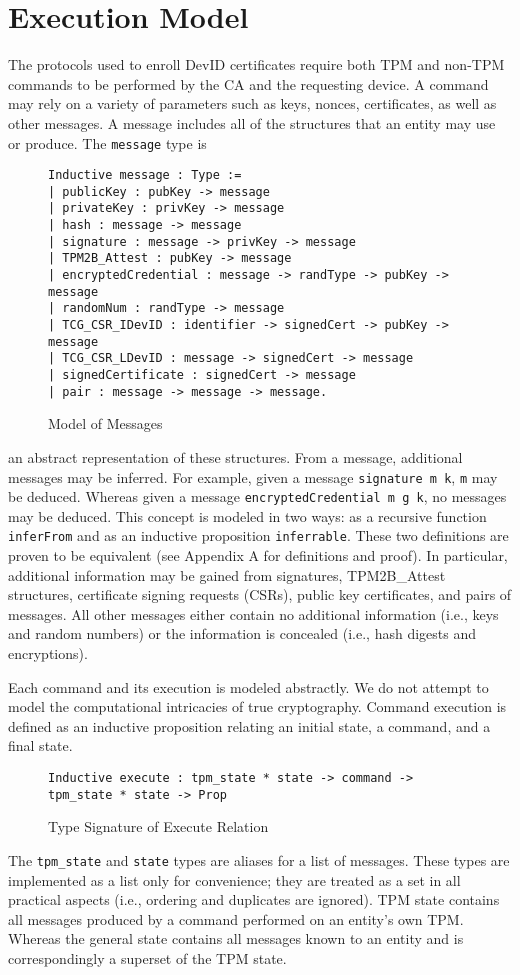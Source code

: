 
\chapter{Execution Model}

The protocols used to enroll DevID certificates require both TPM and non-TPM commands to be performed by the CA and the requesting device. A command may rely on a variety of parameters such as keys, nonces, certificates, as well as other messages. A message includes all of the structures that an entity may use or produce. The \verb|message| type is 
\begin{figure}[h]
\begin{lstlisting}[language=Coq]
Inductive message : Type :=
| publicKey : pubKey -> message
| privateKey : privKey -> message
| hash : message -> message
| signature : message -> privKey -> message
| TPM2B_Attest : pubKey -> message
| encryptedCredential : message -> randType -> pubKey -> message
| randomNum : randType -> message
| TCG_CSR_IDevID : identifier -> signedCert -> pubKey -> message
| TCG_CSR_LDevID : message -> signedCert -> message
| signedCertificate : signedCert -> message
| pair : message -> message -> message.
\end{lstlisting}
\caption{Model of Messages}
\end{figure}
an abstract representation of these structures. From a message, additional messages may be inferred. For example, given a message \verb|signature m k|, \verb|m| may be deduced. Whereas given a message \verb|encryptedCredential m g k|, no messages may be deduced. This concept is modeled in two ways: as a recursive function \verb|inferFrom| and as an inductive proposition \verb|inferrable|. These two definitions are proven to be equivalent (see Appendix A for definitions and proof). In particular, additional information may be gained from signatures, TPM2B\_Attest structures, certificate signing requests (CSRs), public key certificates, and pairs of messages. All other messages either contain no additional information (i.e., keys and random numbers) or the information is concealed (i.e., hash digests and encryptions).



Each command and its execution is modeled abstractly. We do not attempt to model the computational intricacies of true cryptography. Command execution is defined as an inductive proposition relating an initial state, a command, and a final state.  
\begin{figure}[h]
\begin{lstlisting}[language=Coq]
Inductive execute : tpm_state * state -> command -> tpm_state * state -> Prop
\end{lstlisting}
\caption{Type Signature of Execute Relation}
\end{figure}
The \verb|tpm_state| and \verb|state| types are aliases for a list of messages. These types are implemented as a list only for convenience; they are treated as a set in all practical aspects (i.e., ordering and duplicates are ignored). TPM state contains all messages produced by a command performed on an entity's own TPM. Whereas the general state contains all messages known to an entity and is correspondingly a superset of the TPM state.


